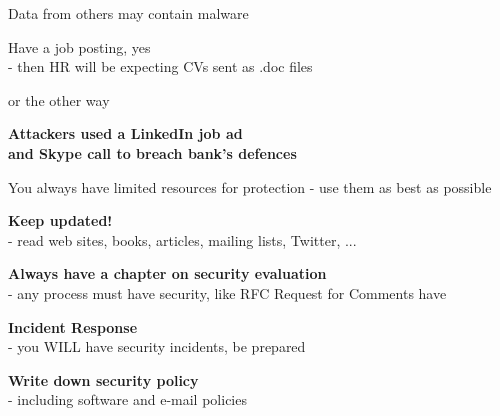 \documentclass[Screen16to9,17pt]{foils}
\begin{document}
Data from others may contain malware

Have a job posting, yes\\
- then HR will be expecting CVs sent as .doc files

\slide{}

or the other way

{\Large\bf Attackers used a LinkedIn job ad\\
and Skype call to breach bank’s defences}

{\footnotesize
{}}




\begin{list1}
\item You always have limited resources for protection - use them as best as possible
\end{list1}




\begin{list1}
\item {\bf Keep updated!}\\ - read web sites, books, articles, mailing lists, Twitter, ...
\item {\bf Always have a chapter on security evaluation }\\ - any process must have security, like RFC Request for Comments have
\item {\bf Incident Response}\\ - you WILL have security incidents, be prepared
\item {\bf Write down security policy}\\ - including software and e-mail policies
\end{list1}

\end{document}
